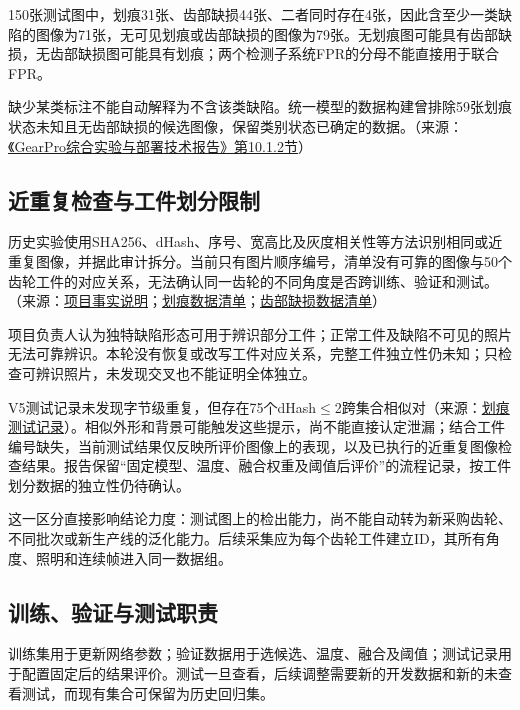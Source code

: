 150张测试图中，划痕31张、齿部缺损44张、二者同时存在4张，因此含至少一类缺陷的图像为71张，无可见划痕或齿部缺损的图像为79张。无划痕图可能具有齿部缺损，无齿部缺损图可能具有划痕；两个检测子系统FPR的分母不能直接用于联合FPR。

缺少某类标注不能自动解释为不含该类缺陷。统一模型的数据构建曾排除59张划痕状态未知且无齿部缺损的候选图像，保留类别状态已确定的数据。（来源：\protect\href{run:../GearPro_综合技术报告_Markdown含配图/GearPro_综合实验与部署技术报告.md}{《GearPro综合实验与部署技术报告》第10.1.2节}）

\FloatBarrier{}\subsection{近重复检查与工件划分限制}
历史实验使用SHA256、dHash、序号、宽高比及灰度相关性等方法识别相同或近重复图像，并据此审计拆分。当前只有图片顺序编号，清单没有可靠的图像与50个齿轮工件的对应关系，无法确认同一齿轮的不同角度是否跨训练、验证和测试。（来源：\protect\hyperlink{project-facts}{项目事实说明}；\protect\hyperlink{source-5}{划痕数据清单}；\protect\hyperlink{source-6}{齿部缺损数据清单}）

项目负责人认为独特缺陷形态可用于辨识部分工件；正常工件及缺陷不可见的照片无法可靠辨识。本轮没有恢复或改写工件对应关系，完整工件独立性仍未知；只检查可辨识照片，未发现交叉也不能证明全体独立。

V5测试记录未发现字节级重复，但存在75个dHash\ensuremath{\leq}2跨集合相似对（来源：\protect\hyperlink{source-3}{划痕测试记录}）。相似外形和背景可能触发这些提示，尚不能直接认定泄漏；结合工件编号缺失，当前测试结果仅反映所评价图像上的表现，以及已执行的近重复图像检查结果。报告保留“固定模型、温度、融合权重及阈值后评价”的流程记录，按工件划分数据的独立性仍待确认。

这一区分直接影响结论力度：测试图上的检出能力，尚不能自动转为新采购齿轮、不同批次或新生产线的泛化能力。后续采集应为每个齿轮工件建立ID，其所有角度、照明和连续帧进入同一数据组。

\FloatBarrier{}\subsection{训练、验证与测试职责}
训练集用于更新网络参数；验证数据用于选候选、温度、融合及阈值；测试记录用于配置固定后的结果评价。测试一旦查看，后续调整需要新的开发数据和新的未查看测试，而现有集合可保留为历史回归集。\cite{ref1}\cite{ref2}

